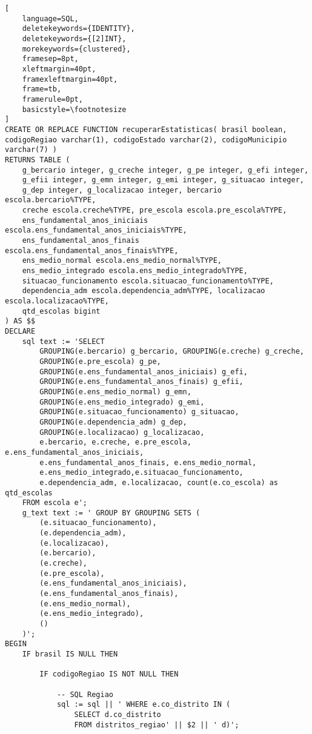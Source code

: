 \documentclass[12pt,a4paper]{article}
\begin{document}
\begin{lstlisting}[ 
    language=SQL,
    deletekeywords={IDENTITY},
    deletekeywords={[2]INT},
    morekeywords={clustered},
    framesep=8pt,
    xleftmargin=40pt,
    framexleftmargin=40pt,
    frame=tb,
    framerule=0pt,
    basicstyle=\footnotesize
]
CREATE OR REPLACE FUNCTION recuperarEstatisticas( brasil boolean, codigoRegiao varchar(1), codigoEstado varchar(2), codigoMunicipio varchar(7) )
RETURNS TABLE ( 
    g_bercario integer, g_creche integer, g_pe integer, g_efi integer,
    g_efii integer, g_emn integer, g_emi integer, g_situacao integer,
    g_dep integer, g_localizacao integer, bercario escola.bercario%TYPE, 
    creche escola.creche%TYPE, pre_escola escola.pre_escola%TYPE, 
    ens_fundamental_anos_iniciais escola.ens_fundamental_anos_iniciais%TYPE, 
    ens_fundamental_anos_finais escola.ens_fundamental_anos_finais%TYPE, 
    ens_medio_normal escola.ens_medio_normal%TYPE, 
    ens_medio_integrado escola.ens_medio_integrado%TYPE, 
    situacao_funcionamento escola.situacao_funcionamento%TYPE,
    dependencia_adm escola.dependencia_adm%TYPE, localizacao escola.localizacao%TYPE, 
    qtd_escolas bigint 
) AS $$
DECLARE
    sql text := 'SELECT
        GROUPING(e.bercario) g_bercario, GROUPING(e.creche) g_creche, 
        GROUPING(e.pre_escola) g_pe, 
        GROUPING(e.ens_fundamental_anos_iniciais) g_efi,
        GROUPING(e.ens_fundamental_anos_finais) g_efii, 
        GROUPING(e.ens_medio_normal) g_emn, 
        GROUPING(e.ens_medio_integrado) g_emi, 
        GROUPING(e.situacao_funcionamento) g_situacao,
        GROUPING(e.dependencia_adm) g_dep, 
        GROUPING(e.localizacao) g_localizacao,
        e.bercario, e.creche, e.pre_escola, e.ens_fundamental_anos_iniciais,
        e.ens_fundamental_anos_finais, e.ens_medio_normal,
        e.ens_medio_integrado,e.situacao_funcionamento, 
        e.dependencia_adm, e.localizacao, count(e.co_escola) as qtd_escolas
    FROM escola e';
    g_text text := ' GROUP BY GROUPING SETS (
        (e.situacao_funcionamento),
        (e.dependencia_adm),
        (e.localizacao),
        (e.bercario),
        (e.creche),
        (e.pre_escola),
        (e.ens_fundamental_anos_iniciais),
        (e.ens_fundamental_anos_finais),
        (e.ens_medio_normal),
        (e.ens_medio_integrado),
        ()
    )';
BEGIN
    IF brasil IS NULL THEN

        IF codigoRegiao IS NOT NULL THEN

            -- SQL Regiao
            sql := sql || ' WHERE e.co_distrito IN (
                SELECT d.co_distrito
                FROM distritos_regiao' || $2 || ' d)';


\end{lstlisting}
\end{document}
